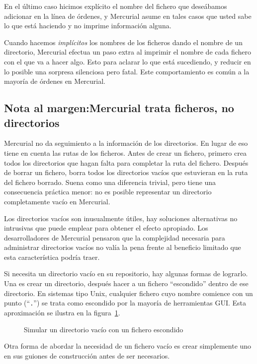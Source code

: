 En el último caso hicimos explícito el nombre del fichero que
deseábamos adicionar en la línea de órdenes, y Mercurial asume en
tales casos que usted sabe lo que está haciendo y no imprime
información alguna.

Cuando hacemos \emph{implícitos} los nombres de los ficheros dando el
nombre de un directorio, Mercurial efectua un paso extra al imprimir
el nombre de cada fichero con el que va a hacer algo.  Esto para
aclarar lo que está sucediendo, y reducir en lo posible una sorpresa
silenciosa pero fatal.  Este comportamiento es común a la mayoría de
órdenes en Mercurial.

\subsection{Nota al margen:Mercurial trata ficheros, no directorios}

Mercurial no da seguimiento a la información de los directorios.  En
lugar de eso tiene en cuenta las rutas de los ficheros.  Antes  de
crear un fichero, primero crea todos los directorios que hagan falta
para completar la ruta del fichero. Después de borrar un fichero,
borra todos los directorios vacíos que estuvieran en la ruta del
fichero borrado. Suena como una diferencia trivial, pero tiene una
consecuencia práctica menor: no es posible representar un directorio
completamente vacío en Mercurial.

Los directorios vacíos son inusualmente útiles, hay soluciones
alternativas no intrusivas que puede emplear para obtener el efecto
apropiado. Los desarrolladores de Mercurial pensaron que la
complejidad necesaria para administrar directorios vacíos no valía la
pena frente al beneficio limitado que esta característica podría traer.

Si necesita un directorio vacío en su repositorio, hay algunas formas
de lograrlo. Una es crear un directorio, después hacer  a
un fichero ``escondido'' dentro de ese directorio. En sistemas tipo
Unix, cualquier fichero cuyo nombre comience con un punto
(``\texttt{.}'') se trata como escondido por la mayoría de
herramientas GUI. Esta aproximación se ilustra en la figura~\ref{ex:daily:hidden}.

\begin{figure}[ht]
  \caption{Simular un directorio vacío con un fichero escondido}
  \label{ex:daily:hidden}
\end{figure}

Otra forma de abordar la necesidad de un fichero vacío es crear
simplemente uno en sus guiones de construcción antes de ser necesarios.

